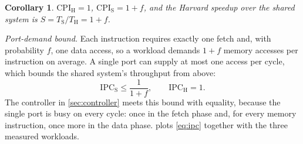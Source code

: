 \documentclass[conference]{IEEEtran}
\newtheorem{corollary}{Corollary}
\newcommand{\Tharv}{T_{\mathrm{H}}}
\newcommand{\Tshr}{T_{\mathrm{S}}}
\begin{document}
\begin{corollary}\label{cor:cpi}
$\mathrm{CPI}_{\mathrm{H}} = 1$, $\mathrm{CPI}_{\mathrm{S}} = 1 + f$, and the Harvard speedup over the
shared system is $S = \Tshr/\Tharv = 1 + f$.
\end{corollary}

\textit{Port-demand bound.} Each instruction requires exactly one fetch and, with probability $f$,
one data access, so a workload demands $1+f$ memory accesses per instruction on average. A
single port can supply at most one access per cycle, which bounds the shared system's throughput
from above:
\begin{equation}
  \mathrm{IPC}_{\mathrm{S}} \le \frac{1}{1+f}, \qquad \mathrm{IPC}_{\mathrm{H}} = 1 .
  \label{eq:ipc}
\end{equation}
The controller in \cref{sec:controller} meets this bound with equality, because the single port is
busy on every cycle: once in the fetch phase and, for every memory instruction, once more in the
data phase.  plots \cref{eq:ipc} together with the three measured workloads.
\end{document}
